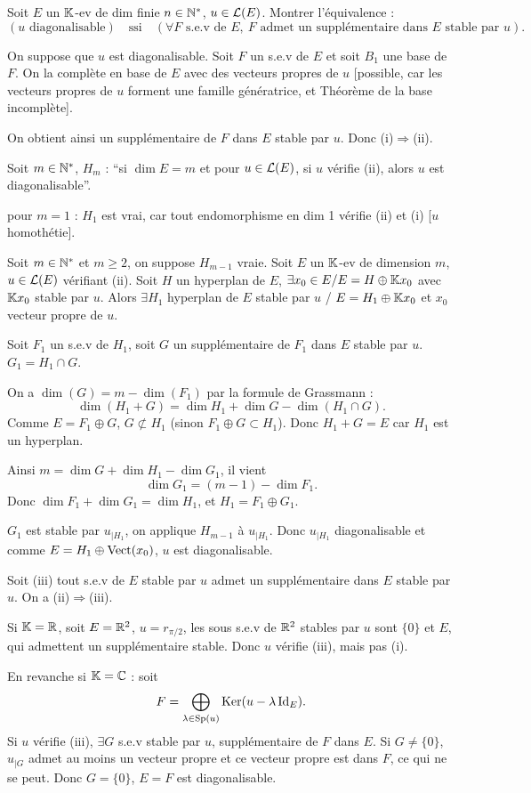 
\begin{statementbox}
Soit $E$ un $\mathbb K$-ev de dim finie $n\in\mathbb N^*$, $u\in\mathcal L(E)$.
Montrer l'équivalence :
\[
(u\text{ diagonalisable})\quad\text{ssi}\quad
(\forall F\text{ s.e.v de }E,\ F\text{ admet un supplémentaire dans }E
\text{ stable par }u).
\]
\end{statementbox}

\begin{solution}
On suppose que $u$ est diagonalisable.
Soit $F$ un s.e.v de $E$ et soit $B_1$ une base de $F$.
On la complète en base de $E$ avec des vecteurs propres de $u$ [possible, car
les vecteurs propres de $u$ forment une famille génératrice, et Théorème de la
base incomplète].

On obtient ainsi un supplémentaire de $F$ dans $E$ stable par $u$.
Donc (i)$\Rightarrow$(ii).

Soit $m\in\mathbb N^*$, $H_m$ : ``si $\dim E=m$ et pour $u\in\mathcal L(E)$, si $u$
vérifie (ii), alors $u$ est diagonalisable''.

pour $m=1$ : $H_1$ est vrai, car tout endomorphisme en dim 1 vérifie (ii) et
(i) [$u$ homothétie].

Soit $m\in\mathbb N^*$ et $m\geq2$, on suppose $H_{m-1}$ vraie.
Soit $E$ un $\mathbb K$-ev de dimension $m$, $u\in\mathcal L(E)$ vérifiant (ii).
Soit $H$ un hyperplan de $E$, $\exists x_0\in E/E=H\oplus\mathbb K x_0$ avec
$\mathbb K x_0$ stable par $u$.
Alors $\exists H_1$ hyperplan de $E$ stable par $u$ / $E=H_1\oplus\mathbb K x_0$ et
$x_0$ vecteur propre de $u$.

Soit $F_1$ un s.e.v de $H_1$, soit $G$ un supplémentaire de $F_1$ dans $E$
stable par $u$.
$G_1=H_1\cap G$.

On a $\dim(G)=m-\dim(F_1)$ par la formule de Grassmann :
\[
\dim(H_1+G)=\dim H_1+\dim G-\dim(H_1\cap G).
\]
Comme $E=F_1\oplus G$, $G\not\subset H_1$ (sinon $F_1\oplus G\subset H_1$).
Donc $H_1+G=E$ car $H_1$ est un hyperplan.

Ainsi $m=\dim G+\dim H_1-\dim G_1$, il vient
\[
\dim G_1=(m-1)-\dim F_1.
\]
Donc $\dim F_1+\dim G_1=\dim H_1$, et $H_1=F_1\oplus G_1$.

$G_1$ est stable par $u_{|H_1}$, on applique $H_{m-1}$ à $u_{|H_1}$.
Donc $u_{|H_1}$ diagonalisable et comme $E=H_1\oplus\operatorname{Vect}(x_0)$,
$u$ est diagonalisable.


\begin{remarkbox}
Soit (iii) tout s.e.v de $E$ stable par $u$ admet un supplémentaire
dans $E$ stable par $u$. On a (ii)$\Rightarrow$(iii).

Si $\mathbb K=\mathbb R$, soit $E=\mathbb R^2$, $u=r_{\pi/2}$, les sous s.e.v de $\mathbb R^2$ stables
par $u$ sont $\{0\}$ et $E$, qui admettent un supplémentaire stable.
Donc $u$ vérifie (iii), mais pas (i).

En revanche si $\mathbb K=\mathbb C$ : soit
\[
F=\bigoplus_{\lambda\in\operatorname{Sp}(u)}\operatorname{Ker}(u-\lambda\operatorname{Id}_E).
\]
Si $u$ vérifie (iii), $\exists G$ s.e.v stable par $u$, supplémentaire de $F$
dans $E$. Si $G\neq\{0\}$, $u_{|G}$ admet au moins un vecteur propre et ce
vecteur propre est dans $F$, ce qui ne se peut. Donc $G=\{0\}$, $E=F$ est
diagonalisable.
\end{remarkbox}
\end{solution}

